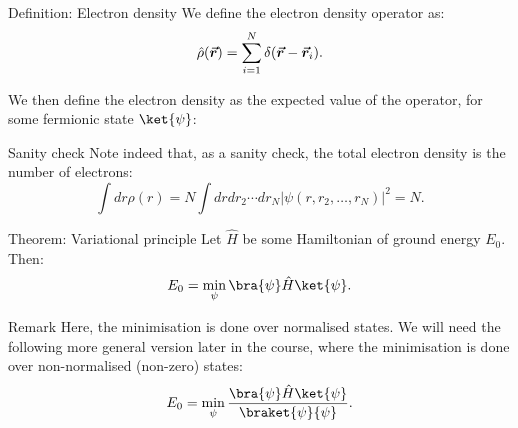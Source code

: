 \documentclass[a4paper]{article}
\begin{document}
\begin{parag}{Definition: Electron density}
    We define the electron density operator as: 
    \[\hat{\rho}\left(\bvec{r}\right) = \sum_{i=1}^{N} \delta\left(\bvec{r} - \bvec{r}_i\right).\]

    We then define the electron density as the expected value of the operator, for some fermionic state $\ket{\psi}$: 

    \begin{subparag}{Sanity check}
        Note indeed that, as a sanity check, the total electron density is the number of electrons: 
        \[\int dr \rho\left(r\right) = N \int dr dr_2 \cdots dr_N \left|\psi\left(r, r_2, \ldots, r_N\right)\right|^2 = N.\]
    \end{subparag}
\end{parag}

\begin{parag}{Theorem: Variational principle}
    Let $\hat{H}$ be some Hamiltonian of ground energy $E_0$. Then: 
    \[E_0 = \min_{\psi} \bra{\psi} \hat{H} \ket{\psi}.\]

    \begin{subparag}{Remark}
        Here, the minimisation is done over normalised states. We will need the following more general version later in the course, where the minimisation is done over non-normalised (non-zero) states:
        \[E_0 = \min_{\psi} \frac{\bra{\psi} \hat{H} \ket{\psi}}{\braket{\psi}{\psi}}.\]
    \end{subparag}
\end{parag}
\end{document}
